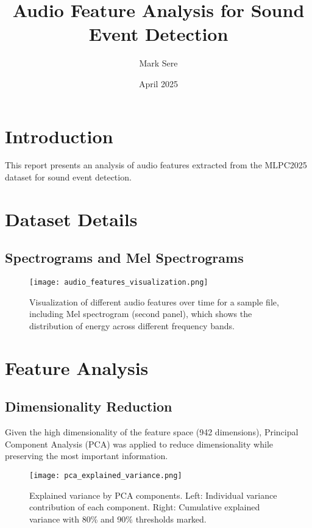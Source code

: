 \documentclass[11pt,a4paper]{article}
\title{\textbf{Audio Feature Analysis for Sound Event Detection}}
\author{Mark Sere}
\date{April 2025}
\begin{document}
\maketitle

\section{Introduction}

This report presents an analysis of audio features extracted from the MLPC2025 dataset for sound event detection.

\section{Dataset Details}

\subsection{Spectrograms and Mel Spectrograms}

\begin{figure}[H]
    \centering
    \texttt{[image: audio\_features\_visualization.png]}
    \caption{Visualization of different audio features over time for a sample file, including Mel spectrogram (second panel), which shows the distribution of energy across different frequency bands.}
    \label{fig:feature_viz}
\end{figure}

\section{Feature Analysis}

\subsection{Dimensionality Reduction}

Given the high dimensionality of the feature space (942 dimensions), Principal Component Analysis (PCA) was applied to reduce dimensionality while preserving the most important information.

\begin{figure}[H]
    \centering
    \texttt{[image: pca\_explained\_variance.png]}
    \caption{Explained variance by PCA components. Left: Individual variance contribution of each component. Right: Cumulative explained variance with 80\% and 90\% thresholds marked.}
    \label{fig:pca_variance}
\end{figure}
\end{document}
